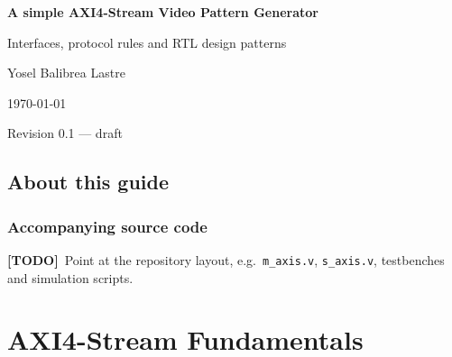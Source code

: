 \documentclass[11pt,a4paper,oneside]{report}
\newcommand{\file}[1]{\texttt{#1}}
\newif\ifshowtodo\showtodotrue
\newcommand{\TODO}[1]{\ifshowtodo\textcolor{red!70!black}{\small\textbf{[TODO]}~#1}\fi}
\begin{document}


\begin{titlepage}
  \centering
  \vspace*{3cm}
  {\Huge\bfseries A simple AXI4-Stream Video Pattern Generator\par}
  \vspace{1cm}
  {\Large Interfaces, protocol rules and RTL design patterns\par}
  \vspace{2.5cm}
  {\large Yosel Balibrea Lastre\par}
  \vspace{0.5cm}
  {\large \today\par}
  \vfill
  {\small Revision 0.1 --- draft\par}
\end{titlepage}
\setcounter{page}{2}   %

\tableofcontents
\listoffigures
\listoftables

\chapter*{About this guide}


\section*{Accompanying source code}
\TODO{Point at the repository layout, e.g.\ \file{m\_axis.v}, \file{s\_axis.v},
testbenches and simulation scripts.}

\cleardoublepage
{}

\part{AXI4-Stream Fundamentals}

\end{document}

